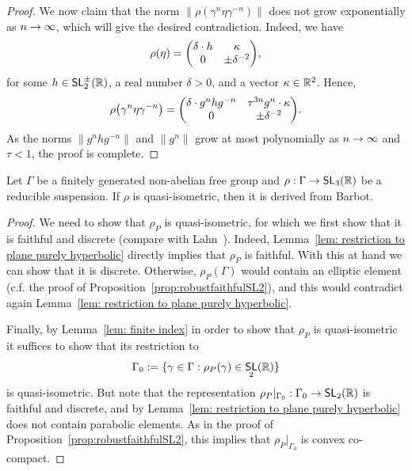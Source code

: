 \documentclass[AHL,Unicode,longabstracts]{cedram}
\DeclareMathOperator{\SL}{\mathsf{SL}}
\newcommand{\R}{\mathbb{R}}
\renewcommand*{\to}{\mathchoice{\longrightarrow}{\rightarrow}{\rightarrow}{\rightarrow}}
\let\originalleft\left
\let\originalright\right
\renewcommand{\left}{\mathopen{}\mathclose\bgroup\originalleft}
\renewcommand{\right}{\aftergroup\egroup\originalright}
\let\oldin\in
\renewcommand{\in}{\mathchoice{\oldin}{\oldin}{\,\oldin\,}{\,\oldin\,}}
\begin{document}
\begin{proof}
We now claim that the norm $\|\rho(\gamma^n\eta\gamma^{-n})\|$ does not grow exponentially as $n\to\infty$, which will give the desired contradiction.
Indeed, we have
\[
\rho(\eta)=\left(
\begin{matrix}
\delta \cdot h & \kappa\\
0 & \pm\delta^{-2}
\end{matrix} \right),
\]
for some $h\in\SL_2^\pm(\R)$, a real number $\delta > 0$, and a vector $\kappa\in\R^2$.
Hence,
\[
\rho\left(\gamma^n\eta\gamma^{-n}\right)=\left(
\begin{matrix}
\delta \cdot g^nhg^{-n} & \tau^{3n} g^{n}\cdot\kappa\\
0 & \pm\delta^{-2}
\end{matrix} \right).
\]
As the norms $\| g^nhg^{-n} \| $ and $\| g^{n} \| $ grow at most polynomially as $n\to\infty$ and $\tau <1$, the proof is complete.
\end{proof}



\begin{coro}\label{cor:redsuspensionQIisDFB}
Let $\Gamma$ be a finitely generated non-abelian free group and $\rho:\Gamma \to \SL_3(\R)$ be a reducible suspension. If $\rho$ is quasi-isometric, then it is derived from Barbot.
\end{coro}



\begin{proof}
We need to show that $\rho_P$ is quasi-isometric, for which we first show that it is faithful and discrete (compare with Lahn~\cite[Proposition~3.1]{lahn}). Indeed, Lemma~\ref{lem: restriction to plane purely hyperbolic} directly implies that $\rho_P$ is faithful. With this at hand we can show that it is discrete. Otherwise, $\rho_P(\Gamma)$ would contain an elliptic element (c.f. the proof of Proposition~\ref{prop:robustfaithfulSL2}), and this would contradict again Lemma~\ref{lem: restriction to plane purely hyperbolic}.

Finally, by Lemma~\ref{lem: finite index} in order to show that $\rho_P$ is quasi-isometric it suffices to show that its restriction to
\[
\Gamma_0:=\{\gamma\in\Gamma: \rho_P(\gamma)\in\SL_2(\R)\}
\]
is quasi-isometric.
But note that the representation $\rho_P\vert_{\Gamma_0}:\Gamma_0\to\SL_2(\R)$ is faithful and discrete, and by Lemma~\ref{lem: restriction to plane purely hyperbolic} does not contain parabolic elements. As in the proof of Proposition~\ref{prop:robustfaithfulSL2}, this implies that $\rho_P\vert_{\Gamma_0}$ is convex co-compact.
\end{proof}
\end{document}
